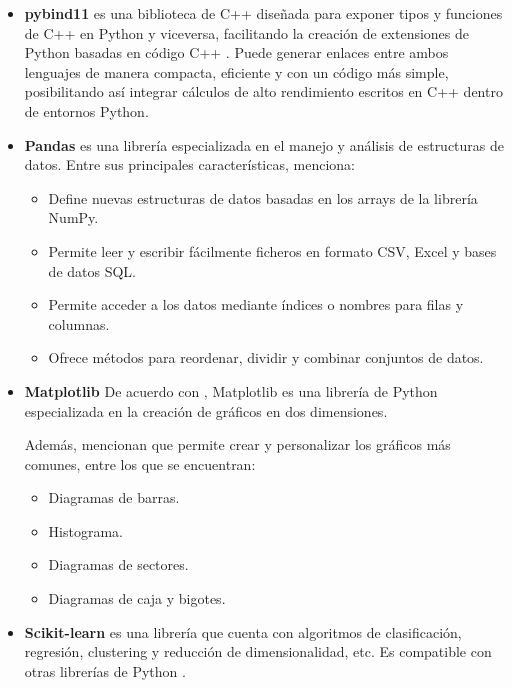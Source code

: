 \begin{itemize}
	\item \textbf{pybind11} es una biblioteca de C++ diseñada para exponer tipos y funciones de C++ en Python y viceversa, facilitando la creación de extensiones de Python basadas en código C++ \cite{pybind}. Puede generar enlaces entre ambos lenguajes de manera compacta, eficiente y con un código más simple, posibilitando así integrar cálculos de alto rendimiento escritos en C++ dentro de entornos Python.

	\item\textbf{Pandas} es una librería especializada en el manejo y análisis de estructuras de datos. Entre sus principales características, \cite{alfaro_pandas} menciona:

	\begin{itemize}
		
		\item Define nuevas estructuras de datos basadas en los arrays de la librería NumPy.
		
		\item Permite leer y escribir fácilmente ficheros en formato CSV, Excel y bases de datos SQL.
		
		\item Permite acceder a los datos mediante índices o nombres para filas y columnas.
		
		\item Ofrece métodos para reordenar, dividir y combinar conjuntos de datos.
		
	\end{itemize}
	
	\item\textbf{Matplotlib} De acuerdo con \cite{alferez_matplotlib}, Matplotlib es una librería de Python especializada en la creación de gráficos en dos dimensiones.
	
	Además, mencionan que permite crear y personalizar los gráficos más comunes, entre los que se encuentran:
	
	\begin{itemize}
		
		\item Diagramas de barras.
		\item Histograma.
		\item Diagramas de sectores.
		\item Diagramas de caja y bigotes.
		
	\end{itemize}

	\item \textbf{Scikit-learn} es una librería que cuenta con algoritmos de clasificación, regresión, clustering y reducción de dimensionalidad, etc. Es compatible con otras librerías de Python \cite{mds_scikitlearn}.
	

\end{itemize}
